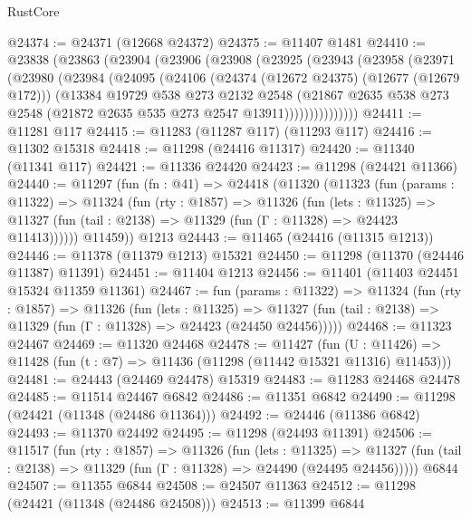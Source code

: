 \begin{lexlean}{RustCore}
\begin{coremodule}
@24374 := @24371 (@12668 @24372)
@24375 := @11407 @1481
@24410 := @23838
    (@23863
      (@23904
        (@23906
          (@23908
            (@23925
              (@23943
                (@23958
                  (@23971
                    (@23980
                      (@23984
                        (@24095
                          (@24106
                            (@24374 (@12672 @24375) (@12677 (@12679 @172)))
                            (@13384
                              @19729
                              @538
                              @273
                              @2132
                              @2548
                              (@21867
                                @2635
                                @538
                                @273
                                @2548
                                (@21872 @2635 @535 @273 @2547 @13911)))))))))))))))
@24411 := @11281 @117
@24415 := @11283 (@11287 @117) (@11293 @117)
@24416 := @11302 @15318
@24418 := @11298 (@24416 @11317)
@24420 := @11340 (@11341 @117)
@24421 := @11336 @24420
@24423 := @11298 (@24421 @11366)
@24440 := @11297
    (fun (fn : @41) =>
    @24418
      (@11320
        (@11323
          (fun (params : @11322) =>
          @11324
            (fun (rty : @1857) =>
            @11326
              (fun (lets : @11325) =>
              @11327 (fun (tail : @2138) => @11329 (fun (Γ : @11328) => @24423 @11413))))))
        @11459))
    @1213
@24443 := @11465 (@24416 (@11315 @1213))
@24446 := @11378 (@11379 @1213) @15321
@24450 := @11298 (@11370 (@24446 @11387) @11391)
@24451 := @11404 @1213
@24456 := @11401 (@11403 @24451 @15324 @11359 @11361)
@24467 := fun (params : @11322) =>
  @11324
    (fun (rty : @1857) =>
    @11326
      (fun (lets : @11325) =>
      @11327 (fun (tail : @2138) => @11329 (fun (Γ : @11328) => @24423 (@24450 @24456)))))
@24468 := @11323 @24467
@24469 := @11320 @24468
@24478 := @11427
    (fun (U : @11426) => @11428 (fun (t : @7) => @11436 (@11298 (@11442 @15321 @11316) @11453)))
@24481 := @24443 (@24469 @24478) @15319
@24483 := @11283 @24468 @24478
@24485 := @11514 @24467 @6842
@24486 := @11351 @6842
@24490 := @11298 (@24421 (@11348 (@24486 @11364)))
@24492 := @24446 (@11386 @6842)
@24493 := @11370 @24492
@24495 := @11298 (@24493 @11391)
@24506 := @11517
    (fun (rty : @1857) =>
    @11326
      (fun (lets : @11325) =>
      @11327 (fun (tail : @2138) => @11329 (fun (Γ : @11328) => @24490 (@24495 @24456)))))
    @6844
@24507 := @11355 @6844
@24508 := @24507 @11363
@24512 := @11298 (@24421 (@11348 (@24486 @24508)))
@24513 := @11399 @6844

\end{coremodule}
\end{lexlean}
